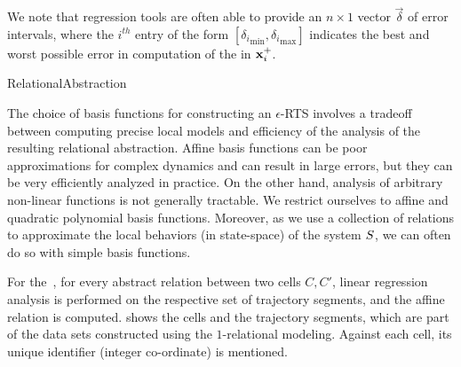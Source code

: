 
We note that regression tools are often able to provide an
$n\times 1$ vector $\vec{\delta}$ of error intervals, where the
$i^{th}$ entry of the form $[{\delta_i}_{\min},{\delta_i}_{\max}]$
indicates the best and worst possible error in computation of the
in $\mathbf{x}^{+}_i$.

\begin{algorithm}[t]
\DontPrintSemicolon
\caption{RelationalAbstraction\label{algo:relabs}}
\KwOut{$\RTSAbstraction{\epsilon}{\System}$}
\end{algorithm}

The choice of basis functions for constructing an $\epsilon$-RTS
involves a tradeoff between computing precise local models and
efficiency of the analysis of the resulting relational abstraction.
Affine basis functions can be poor approximations for complex dynamics
and can result in large errors, but they can be very efficiently
analyzed in practice.  On the other hand, analysis of arbitrary
non-linear functions is not generally tractable. We restrict ourselves
to affine and quadratic polynomial basis functions.  Moreover, as we
use a collection of relations to approximate the local behaviors (in
state-space) of the system $S$, we can often do so with simple
basis functions.

\begin{example}
    For the~, for every abstract relation between two cells
    $C, C'$, linear regression analysis is performed on the respective
    set of trajectory segments, and the affine relation is computed.
     shows the cells and the trajectory
    segments, which are part of the data sets constructed using the
    $1$-relational modeling. Against each cell, its unique identifier
    (integer co-ordinate) is mentioned.
\end{example}

